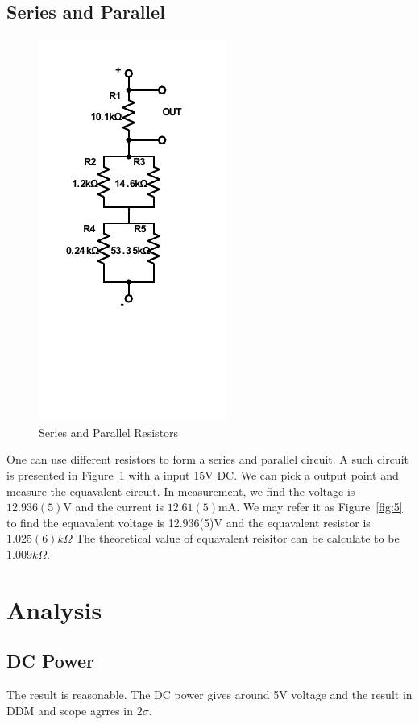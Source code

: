 \documentclass[aps,prl,reprint]{revtex4-1}
\begin{document}
    \subsection{Series and Parallel}
    \begin{figure}[h]
        \centering
        \includegraphics{images/plot4.pdf}
        \caption{Series and Parallel Resistors}
        \label{fig:4}
    \end{figure}
    One can use different resistors to form a series and parallel circuit. A such circuit is presented in Figure~\ref{fig:4} with a input 15V DC. We can pick a output point and measure the equavalent circuit. In measurement, we find the voltage is $12.936(5)$V and the current is $12.61(5)$mA. We may refer it as Figure~\ref{fig:5} to find the equavalent voltage is 12.936(5)V and the equavalent resistor is $1.025(6)k\Omega$ The theoretical value of equavalent reisitor can be calculate to be $1.009k\Omega$.

\section{Analysis}
    \subsection{DC Power}
    The result is reasonable. The DC power gives around 5V voltage and the result in DDM and scope agrres in $2\sigma$.
\end{document}
